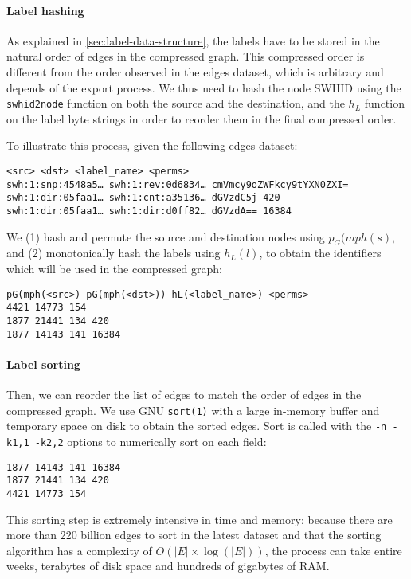 \paragraph{Label hashing}
As explained in \cref{sec:label-data-structure}, the labels have to be stored
in the natural order of edges in the compressed graph. This compressed order is
different from the order observed in the edges dataset, which is
arbitrary and depends of the export process. We thus need to hash the node
\gls{SWHID} using the \texttt{swhid2node} function on both the source and the
destination, and the $h_L$ function on the label byte strings in order to
reorder them in the final compressed order.

To illustrate this process, given the following edges dataset:

\begin{verbatim}
<src> <dst> <label_name> <perms>
swh:1:snp:4548a5… swh:1:rev:0d6834… cmVmcy9oZWFkcy9tYXN0ZXI=
swh:1:dir:05faa1… swh:1:cnt:a35136… dGVzdC5j 420
swh:1:dir:05faa1… swh:1:dir:d0ff82… dGVzdA== 16384
\end{verbatim}

We (1) hash and permute the source and destination nodes using
$p_G(\mathit{mph}(s)$, and (2) monotonically hash the labels using $h_L(l)$, to
obtain the identifiers which will be used in the compressed graph:

\begin{verbatim}
pG(mph(<src>) pG(mph(<dst>)) hL(<label_name>) <perms>
4421 14773 154
1877 21441 134 420
1877 14143 141 16384
\end{verbatim}

\paragraph{Label sorting}
Then, we can reorder the list of edges to match the order of edges in the
compressed graph.
We use GNU \texttt{sort(1)} with a large in-memory buffer and temporary
space on disk to obtain the sorted edges. Sort is called with the \texttt{-n
-k1,1 -k2,2} options to numerically sort on each field:

\begin{verbatim}
1877 14143 141 16384
1877 21441 134 420
4421 14773 154
\end{verbatim}

This sorting step is extremely intensive in time and memory: because there are
more than 220 billion edges to sort in the latest dataset and that the sorting
algorithm has a complexity of $O(|E| \times \log(|E|))$, the process can
take entire weeks, terabytes of disk space and hundreds of gigabytes of RAM.

